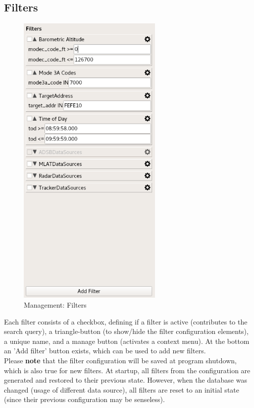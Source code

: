 \subsection{Filters}

\begin{figure}[H]
  \center
    \includegraphics[width=7cm,frame]{../screenshots/management_filters.png}
  \caption{Management: Filters}
  \label{fig:management_filters}
\end{figure}

Each filter consists of a checkbox, defining if a filter is active (contributes to the search query), a triangle-button (to show/hide the filter configuration elements), a unique name, and a manage button (activates a context menu). At the bottom an 'Add filter' button exists, which can be used to add new filters. \\

Please \textbf{note} that the filter configuration will be saved at program shutdown, which is also true for new
filters.   At  startup,  all  filters  from  the  configuration  are  generated  and  restored  to  their  previous  state. However, when the database was changed (usage of different data source), all filters are reset to an initial
state (since their previous configuration may be senseless). \\

